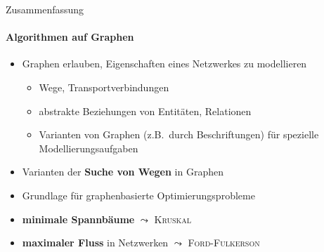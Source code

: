 \documentclass{vorlesung}
\newcommand{\mrk}[1]{\textcolor{ubrot}{\bfseries #1}}
\begin{document}
\begin{frame}{Zusammenfassung}
\framesubtitle{Algorithmen auf Graphen}
\begin{itemize}
	\item Graphen erlauben, Eigenschaften eines Netzwerkes zu modellieren
	\begin{itemize}
		\item Wege, Transportverbindungen
		\item abstrakte Beziehungen von Entitäten, Relationen 
		\item Varianten von Graphen (z.B.\ durch Beschriftungen) für spezielle Modellierungsaufgaben
	\end{itemize}
	\item Varianten der \mrk{Suche von Wegen} in Graphen
		\item Grundlage für graphenbasierte Optimierungsprobleme
	\item \mrk{minimale Spannbäume} $\leadsto$ \textsc{Kruskal}
	\item \mrk{maximaler Fluss} in Netzwerken $\leadsto$ \textsc{Ford-Fulkerson}
\end{itemize}
\end{frame}
\end{document}
